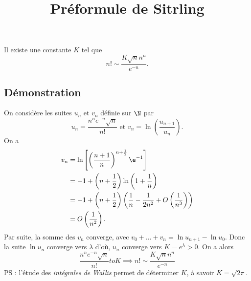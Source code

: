 \documentclass[fontsize=12pt,twoside=false,parskip=half]{scrartcl}
\title{Préformule de Sitrling}
\date{}
\author{}
\begin{document}
\maketitle
   \begin{Theoreme}
      Il existe une constante $K$ tel que
      \[
        n! \sim \frac{K \sqrt{n} n^n}{e^{-n}}.
      \]
   \end{Theoreme}
   \subsection{Démonstration}
      On considère les suites $u_n$ et $v_n$ définie sur $\N$ par
      \[
        u_n = \frac{n^ne^{-n}\sqrt{n}}{n!} \text{ et } 
        v_n = \ln \left(\frac{u_{n + 1}}{u_n}\right).
      \]
      On a 
      \begin{align*}
        v_n &= \ln \left[ \left(\frac{n + 1}{n}\right)^{n + \frac{1}{2}} \e^{-1}\right] \\
            &= -1 + \left( n + \frac{1}{2}\right) \ln \left(1 + \frac{1}{n}\right)\\
            &= -1 + \left( n + \frac{1}{2}\right) \left(\frac{1}{n} - \frac{1}{2n^2} + O\left(\frac{1}{n^3}\right)\right) \\
            &= O\left(\frac{1}{n^2}\right).
      \end{align*}
      Par suite, la somme des $v_n$ converge, avec $v_0 + \ldots + v_n = \ln u_{n + 1} - \ln u_0$.
      Donc la suite $\ln u_n$ converge vers $\lambda$ d'où, $u_n$ converge vers $K = e^\lambda > 0$.
      On a alors
      \[
        \frac{n^ne^{-n}\sqrt{n}}{n!} to K \implies
        n! \sim \frac{K \sqrt{n} n^n}{e^{-n}}  
      \]
      PS : l'étude des \emph{intégrales de Wallis} permet de déterminer $K$, à
           savoir $K = \sqrt{2\pi}$.
\end{document}
